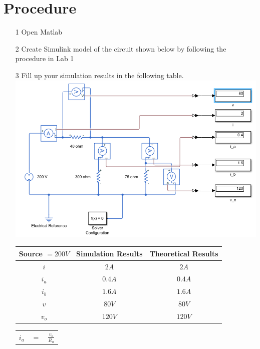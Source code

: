 \documentclass[a4paper]{article}
\begin{document}
\section*{Procedure}
\begin{itemize}
	\item[1] Open Matlab
	\item[2] Create Simulink model of the circuit shown below by following the procedure in Lab 1
	\item[3] Fill up your simulation results in the following table. \\
	      \includegraphics[scale=0.5]{circuit-1+200.png} \\
	      \begin{tabular}{|c|c|c|}
	      	\hline
	      	Source $= 200 V$ & Simulation Results & Theoretical Results \\
	      	\hline
	      	$i$              & $2A$               & $2A$                \\
	      	\hline
	      	$i_{a}$          & $0.4A$             & $0.4A$              \\
	      	\hline
	      	$i_{b}$          & $1.6A$             & $1.6A$              \\
	      	\hline
	      	$v$              & $80V$              & $80V$               \\
	      	\hline
	      	$v_{o}$          & $120V$             & $120V$              \\
	      	\hline
	      \end{tabular} 
	      \begin{tabular}{rcl}
	      	$i_{a}$ & $=$ & $\frac{v_{o}}{R_{a}}$                                                    \\

\end{tabular}
\end{itemize}
\end{document}
